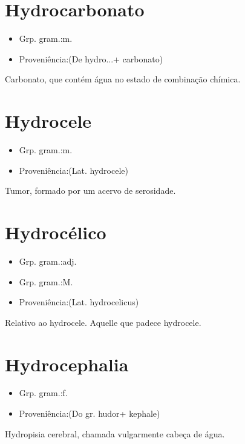 \documentclass{article}
\begin{document}
\section{Hydrocarbonato}
\begin{itemize}
\item {Grp. gram.:m.}
\end{itemize}
\begin{itemize}
\item {Proveniência:(De \textunderscore hydro...\textunderscore  + \textunderscore carbonato\textunderscore )}
\end{itemize}
Carbonato, que contém água no estado de combinação chímica.
\section{Hydrocele}
\begin{itemize}
\item {Grp. gram.:m.}
\end{itemize}
\begin{itemize}
\item {Proveniência:(Lat. \textunderscore hydrocele\textunderscore )}
\end{itemize}
Tumor, formado por um acervo de serosidade.
\section{Hydrocélico}
\begin{itemize}
\item {Grp. gram.:adj.}
\end{itemize}
\begin{itemize}
\item {Grp. gram.:M.}
\end{itemize}
\begin{itemize}
\item {Proveniência:(Lat. \textunderscore hydrocelicus\textunderscore )}
\end{itemize}
Relativo ao hydrocele.
Aquelle que padece hydrocele.
\section{Hydrocephalia}
\begin{itemize}
\item {Grp. gram.:f.}
\end{itemize}
\begin{itemize}
\item {Proveniência:(Do gr. \textunderscore hudor\textunderscore  + \textunderscore kephale\textunderscore )}
\end{itemize}
Hydropisia cerebral, chamada vulgarmente \textunderscore cabeça de água\textunderscore .
\end{document}
